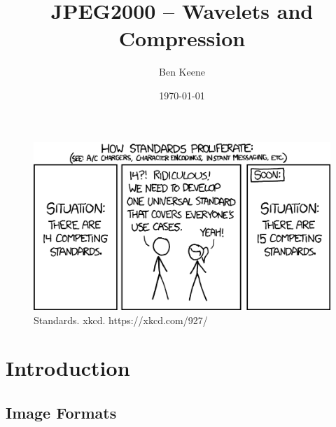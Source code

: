 \documentclass[9pt]{beamer}
\begin{document}
\title{JPEG2000 -- Wavelets and Compression}  
\author{Ben Keene}
\date{\today} 

\begin{frame}
	\titlepage
\end{frame}

\begin{frame}
	\begin{figure}[h]
		\centering
		\includegraphics[width=\textwidth]{./images/standards_2x.png}
		\tiny{Standards. xkcd. https://xkcd.com/927/ }
	\end{figure}	
\end{frame}

\section{Introduction}

\subsection{Image Formats}
\end{document}
